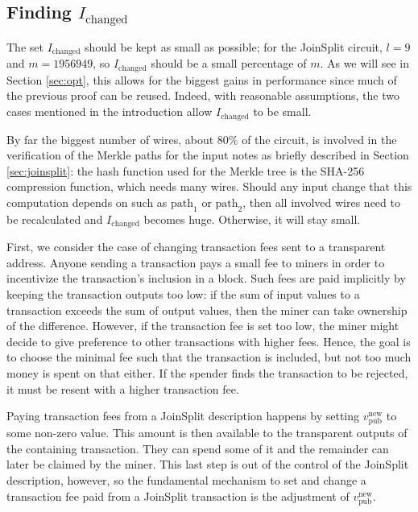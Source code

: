 \documentclass{article}
\begin{document}
\subsection{Finding $I_\text{changed}$} \label{sec:changed}

The set $I_\text{changed}$ should be kept as small as possible; for the JoinSplit circuit, $l=9$ and $m=1956949$, so $I_\text{changed}$ should be a small percentage of $m$.
As we will see in Section \ref{sec:opt}, this allows for the biggest gains in performance since much of the previous proof can be reused.
Indeed, with reasonable assumptions, the two cases mentioned in the introduction allow $I_\text{changed}$ to be small.

By far the biggest number of wires, about $80\%$ of the circuit, is involved in the verification of the Merkle paths for the input notes as briefly described in Section \ref{sec:joinsplit}:
the hash function used for the Merkle tree is the SHA-256 compression function, which needs many wires.
Should any input change that this computation depends on such as $\text{path}_1$ or $\text{path}_2$, then all involved wires need to be recalculated and $I_\text{changed}$ becomes huge.
Otherwise, it will stay small.

First, we consider the case of changing transaction fees sent to a transparent address.
Anyone sending a transaction pays a small fee to miners in order to incentivize the transaction's inclusion in a block.
Such fees are paid implicitly by keeping the transaction outputs too low: if the sum of input values to a transaction exceeds the sum of output values, then the miner can take ownership of the difference.
However, if the transaction fee is set too low, the miner might decide to give preference to other transactions with higher fees.
Hence, the goal is to choose the minimal fee such that the transaction is included, but not too much money is spent on that either.
If the spender finds the transaction to be rejected, it must be resent with a higher transaction fee.

Paying transaction fees from a JoinSplit description happens by setting $v_\text{pub}^\text{new}$ to some non-zero value.
This amount is then available to the transparent outputs of the containing transaction.
They can spend some of it and the remainder can later be claimed by the miner.
This last step is out of the control of the JoinSplit description, however, so the fundamental mechanism to set and change a transaction fee paid from a JoinSplit transaction is the adjustment of $v_\text{pub}^\text{new}$.
\end{document}

